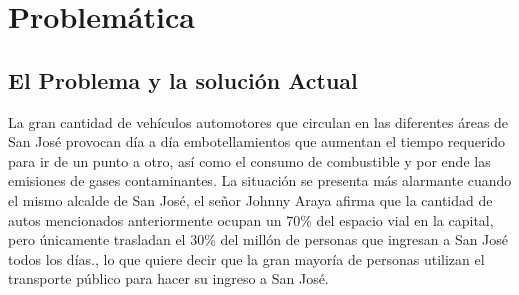 \documentclass[12pt,journal,compsoc]{IEEEtran}
\begin{document}
%



\section{Problem\'{a}tica}
	\subsection{El Problema y la soluci\'{o}n Actual}
	 
		La gran cantidad de veh\'{i}culos automotores que circulan en las diferentes \'{a}reas
	de San Jos\'{e} provocan d\'{i}a a d\'{i}a embotellamientos que aumentan el tiempo requerido para ir de un punto a otro, as\'{i} como el consumo de combustible y por ende las emisiones de gases contaminantes.
	La situaci\'{o}n se presenta m\'{a}s alarmante cuando el mismo alcalde de San Jos\'{e}, el
	se\~{n}or Johnny Araya afirma que la cantidad de autos mencionados
	anteriormente ocupan un 70\% del espacio vial en la capital, pero \'{u}nicamente trasladan el 30\% del mill\'{o}n de personas que ingresan a San Jos\'{e} todos los d\'{i}as.\cite{Villegas2012}, lo que quiere decir que la gran mayoría de personas utilizan el transporte p\'ublico para hacer su ingreso a San Jos\'e.
\end{document}
